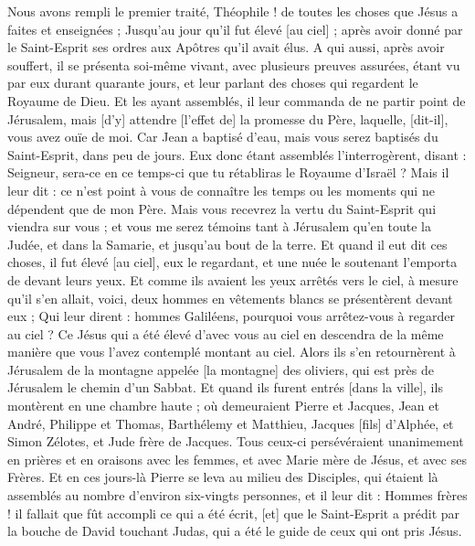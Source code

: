 \BFont
\begin{multicols}{2}
\VerseOne{}Nous avons rempli le premier traité, Théophile ! de toutes les choses que Jésus a faites et enseignées ;
Jusqu'au jour qu'il fut élevé [au ciel] ; après avoir donné par le Saint-Esprit ses ordres aux Apôtres qu'il avait élus.
A qui aussi, après avoir souffert, il se présenta soi-même vivant, avec plusieurs preuves assurées, étant vu par eux durant quarante jours, et leur parlant des choses qui regardent le Royaume de Dieu.
Et les ayant assemblés, il leur commanda de ne partir point de Jérusalem, mais [d'y] attendre [l'effet de] la promesse du Père, laquelle, [dit-il], vous avez ouïe de moi.
Car Jean a baptisé d'eau, mais vous serez baptisés du Saint-Esprit, dans peu de jours.
Eux donc étant assemblés l'interrogèrent, disant : Seigneur, sera-ce en ce temps-ci que tu rétabliras le Royaume d'Israël ?
Mais il leur dit : ce n'est point à vous de connaître les temps ou les moments qui ne dépendent que de mon Père.
Mais vous recevrez la vertu du Saint-Esprit qui viendra sur vous ; et vous me serez témoins tant à Jérusalem qu'en toute la Judée, et dans la Samarie, et jusqu'au bout de la terre.
Et quand il eut dit ces choses, il fut élevé [au ciel], eux le regardant, et une nuée le soutenant l'emporta de devant leurs yeux.
Et comme ils avaient les yeux arrêtés vers le ciel, à mesure qu'il s'en allait, voici, deux hommes en vêtements blancs se présentèrent devant eux ;
Qui leur dirent : hommes Galiléens, pourquoi vous arrêtez-vous à regarder au ciel ? Ce Jésus qui a été élevé d'avec vous au ciel en descendra de la même manière que vous l'avez contemplé montant au ciel.
Alors ils s'en retournèrent à Jérusalem de la montagne appelée [la montagne] des oliviers, qui est près de Jérusalem le chemin d'un Sabbat.
Et quand ils furent entrés [dans la ville], ils montèrent en une chambre haute ; où demeuraient Pierre et Jacques, Jean et André, Philippe et Thomas, Barthélemy et Matthieu, Jacques [fils] d'Alphée, et Simon Zélotes, et Jude frère de Jacques.
Tous ceux-ci persévéraient unanimement en prières et en oraisons avec les femmes, et avec Marie mère de Jésus, et avec ses Frères.
Et en ces jours-là Pierre se leva au milieu des Disciples, qui étaient là assemblés au nombre d'environ six-vingts personnes, et il leur dit :
Hommes frères ! il fallait que fût accompli ce qui a été écrit, [et] que le Saint-Esprit a prédit par la bouche de David touchant Judas, qui a été le guide de ceux qui ont pris Jésus.

\end{multicols}
